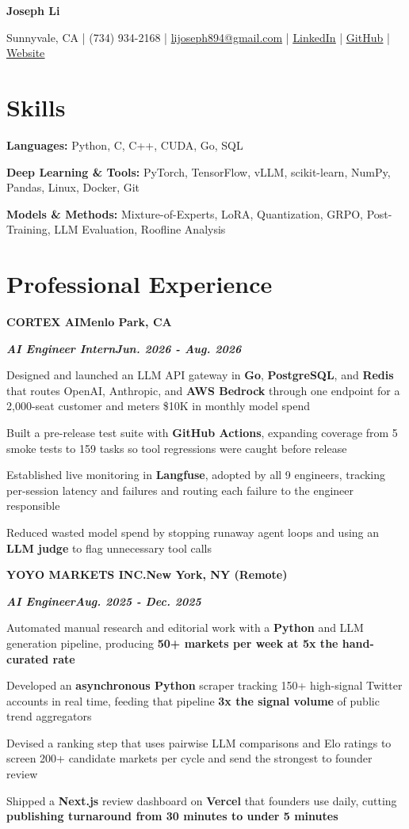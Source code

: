\documentclass[10pt]{article}
\renewcommand{\resumeheader}[2]{%
  {\centering\fontsize{16}{18}\selectfont\bfseries #1\par}%
  \vspace{4pt}%
  {\centering\fontsize{10.5}{13}\selectfont #2\par}%
  \vspace{6pt}%
}
\renewcommand{\skill}[2]{\textbf{#1:} #2\par\vspace{1.5pt}}
\newcommand{\job}[4]{%
  \vspace{0pt}%
  \textbf{\MakeUppercase{#1}}\hfill\textbf{#2}\par
  \vspace{0.5pt}%
  \textbf{\textit{#3}}\hfill\textbf{\textit{#4}}\par
}
\begin{document}
\resumeheader{Joseph Li}{%
Sunnyvale, CA | (734) 934-2168 | \href{mailto:lijoseph894@gmail.com}{lijoseph894@gmail.com} | \href{https://www.linkedin.com/in/lijoseph894/}{\underline{LinkedIn}} | \href{https://github.com/josephl894}{\underline{GitHub}} | \href{https://josephl894.github.io}{\underline{Website}}}

\section{Skills}
\skill{Languages}{Python, C, C++, CUDA, Go, SQL}
\skill{Deep Learning \& Tools}{PyTorch, TensorFlow, vLLM, scikit-learn, NumPy, Pandas, Linux, Docker, Git}
\skill{Models \& Methods}{Mixture-of-Experts, LoRA, Quantization, GRPO, Post-Training, LLM Evaluation, Roofline Analysis}

\section{Professional Experience}
\job{Cortex AI}{Menlo Park, CA}{AI Engineer Intern}{Jun. 2026 - Aug. 2026}
\begin{bullets}
  \item Designed and launched an LLM API gateway in \textbf{Go}, \textbf{PostgreSQL}, and \textbf{Redis} that routes OpenAI, Anthropic, and \textbf{AWS Bedrock} through one endpoint for a 2,000-seat customer and meters \$10K in monthly model spend
  \item Built a pre-release test suite with \textbf{GitHub Actions}, expanding coverage from 5 smoke tests to 159 tasks so tool regressions were caught before release
  \item Established live monitoring in \textbf{Langfuse}, adopted by all 9 engineers, tracking per-session latency and failures and routing each failure to the engineer responsible
  \item Reduced wasted model spend by stopping runaway agent loops and using an \textbf{LLM judge} to flag unnecessary tool calls
\end{bullets}

\vspace{3pt}
\job{Yoyo Markets Inc.}{New York, NY (Remote)}{AI Engineer}{Aug. 2025 - Dec. 2025}
\begin{bullets}
  \item Automated manual research and editorial work with a \textbf{Python} and LLM generation pipeline, producing \textbf{50+ markets per week at 5x the hand-curated rate}
  \item Developed an \textbf{asynchronous Python} scraper tracking 150+ high-signal Twitter accounts in real time, feeding that pipeline \textbf{3x the signal volume} of public trend aggregators
  \item Devised a ranking step that uses pairwise LLM comparisons and Elo ratings to screen 200+ candidate markets per cycle and send the strongest to founder review
  \item Shipped a \textbf{Next.js} review dashboard on \textbf{Vercel} that founders use daily, cutting \textbf{publishing turnaround from 30 minutes to under 5 minutes}
\end{bullets}
\end{document}
